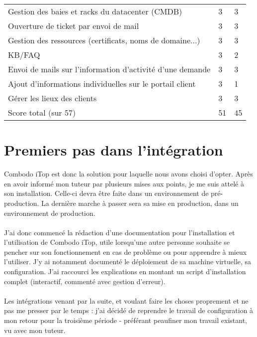 \begin{table}[h!]
\begin{tabular}{|l|l|l|}
Gestion des baies et racks du datacenter (CMDB)           & 3            & 3            \\
Ouverture de ticket par envoi de mail                     & 3            & 3            \\
Gestion des ressources (certificats, noms de domaine...)  & 3            & 3            \\
KB/FAQ                                                    & 3            & 2            \\
Envoi de mails sur l'information d'activité d'une demande & 3            & 3            \\
Ajout d'informations individuelles sur le portail client  & 3            & 1            \\
Gérer les lieux des clients                               & 3            & 3            \\ \hline
Score total (sur 57)                                      & 51           & 45           \\
\hline
\end{tabular}
\end{table}

\section{Premiers pas dans l'intégration}

Combodo iTop est donc la solution pour laquelle nous avons choisi d'opter. Après en avoir informé mon tuteur par plusieurs mises aux points, je me suis attelé à son installation. Celle-ci devra être faite dans un environnement de pré-production. La dernière marche à passer sera sa mise en production, dans un environnement de production.
\\ \\
J'ai donc commencé la rédaction d'une documentation pour l'installation et l'utilisation de Combodo iTop, utile lorsqu'une autre personne souhaite se pencher sur son fonctionnement en cas de problème ou pour apprendre à mieux l'utiliser. J'y ai notamment documenté le déploiement de sa machine virtuelle, sa configuration. J'ai raccourci les explications en montant un script d'installation complet (interactif, commenté avec gestion d'erreur).
\\ \\
Les intégrations venant par la suite, et voulant faire les choses proprement et ne pas me presser par le temps : j'ai décidé de reprendre le travail de configuration à mon retour pour la troisième période - préférant peaufiner mon travail existant, vu avec mon tuteur.